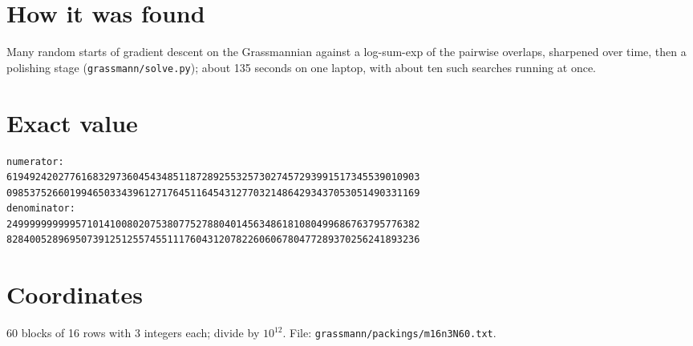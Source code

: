 \documentclass[11pt,a4paper]{article}
\begin{document}
\section{How it was found}
Many random starts of gradient descent on the Grassmannian against a log-sum-exp of the pairwise overlaps, sharpened over time, then a polishing stage (\texttt{grassmann/solve.py}); about 135 seconds on one laptop, with about ten such searches running at once.


\appendix
\section{Exact value}
{\small
\begin{verbatim}
numerator:
619492420277616832973604543485118728925532573027457293991517345539010903
098537526601994650334396127176451164543127703214864293437053051490331169
denominator:
249999999999571014100802075380775278804014563486181080499686763795776382
828400528969507391251255745511176043120782260606780477289370256241893236
\end{verbatim}}

\section{Coordinates}
60 blocks of 16 rows with 3 integers each; divide by $10^{12}$. File: \texttt{grassmann/packings/m16n3N60.txt}.
{\tiny
\begin{multicols}{3}
\end{multicols}}
\end{document}
